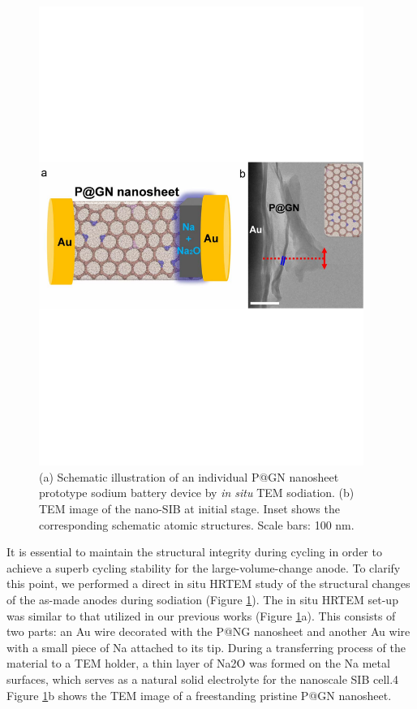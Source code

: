\begin{figure}  
\centering
\includegraphics[width=300pt,angle=0]{figures/figure4_3ab}
\caption[{\em in situ} probing on P@GN SIB setup]
{
(a) Schematic illustration of an individual P@GN nanosheet prototype sodium battery device by {\em in situ} TEM sodiation. (b) TEM image of the nano-SIB at initial stage. Inset shows the corresponding schematic atomic structures. Scale bars: 100 nm.
\label{fig:4_3ab}}
\end{figure}

It is essential to maintain the structural integrity during cycling in order to achieve a superb cycling stability for the large-volume-change anode.\cite{Liu2014a} To clarify this point, we performed a direct in situ HRTEM study of the structural changes of the as-made anodes during sodiation (Figure \ref{fig:4_3ab}). The in situ HRTEM set-up was similar to that utilized in our previous works (Figure \ref{fig:4_3ab}a).\cite{Wang2014f,Wang2012g} This consists of two parts: an Au wire decorated with the P@NG nanosheet and another Au wire with a small piece of Na attached to its tip. During a transferring process of the material to a TEM holder, a thin layer of Na2O was formed on the Na metal surfaces, which serves as a natural solid electrolyte for the nanoscale SIB cell.4 Figure \ref{fig:4_3ab}b shows the TEM image of a freestanding pristine P@GN nanosheet. 

